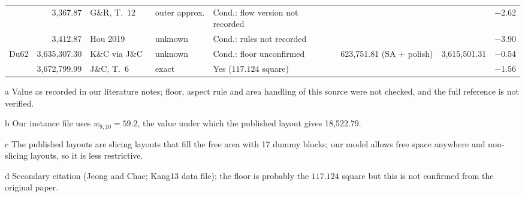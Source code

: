\begin{table}[tbp]
\begin{threeparttable}
\begin{tabular}{lrll>{\raggedright\arraybackslash}p{2.35cm}>{\raggedleft\arraybackslash}p{2.2cm}rr}
 & 3{,}367.87 & G\&R, T.~12~\cite{goncalves2015} & outer approx. & Cond.: flow version not recorded &  &  & $-$2.62 \\
 & 3{,}412.87 & Hou 2019\tnote{a} & unknown & Cond.: rules not recorded &  &  & $-$3.90 \\
\addlinespace
Du62 & 3{,}635{,}307.30 & K\&C via J\&C~\cite{kang2017} & unknown & Cond.: floor unconfirmed\tnote{d} & 3{,}623{,}751.81 (SA + polish) & 3{,}615{,}501.31 & $-$0.54 \\
 & 3{,}672{,}799.99 & J\&C, T.~6~\cite{jeong2026} & exact & Yes ($117.124$ square) &  &  & $-$1.56 \\
\bottomrule
\end{tabular}
\begin{tablenotes}\footnotesize
\item[a] Value as recorded in our literature notes; floor, aspect rule and area handling of this source were not
checked, and the full reference is not verified.
\item[b] Our instance file uses $w_{9,10}=59.2$, the value under which the published layout gives 18{,}522.79.
\item[c] The published layouts are slicing layouts that fill the free area with 17 dummy blocks; our model allows
free space anywhere and non-slicing layouts, so it is less restrictive.
\item[d] Secondary citation (Jeong and Chae; Kang13 data file); the floor is probably the $117.124$ square but this
is not confirmed from the original paper.
\end{tablenotes}
\end{threeparttable}
\end{table}
